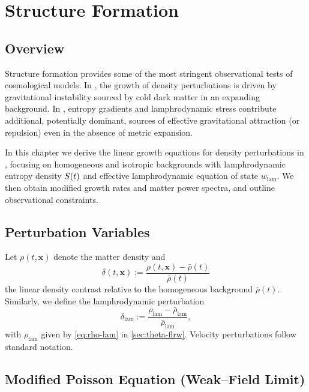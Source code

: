 
\chapter{Structure Formation}
\label{chap:structure-formation}

\section{Overview}

Structure formation provides some of the most stringent observational
tests of cosmological models. In \LCDM{}, the growth of density
perturbations is driven by gravitational instability sourced by cold
dark matter in an expanding background. In \rsvpabbr{}, entropy gradients
and lamphrodynamic stress contribute additional, potentially dominant,
sources of effective gravitational attraction (or repulsion) even in
the absence of metric expansion.

In this chapter we derive the linear growth equations for density
perturbations in \rsvpabbr{}, focusing on homogeneous and isotropic
backgrounds with lamphrodynamic entropy density $S(t)$ and
effective lamphrodynamic equation of state $w_{\mathrm{lam}}$. We then
obtain modified growth rates and matter power spectra, and outline
observational constraints.

\section{Perturbation Variables}

Let $\rho(t,\mathbf{x})$ denote the matter density and
\[
  \delta(t,\mathbf{x}) := \frac{\rho(t,\mathbf{x}) - \bar{\rho}(t)}
  {\bar{\rho}(t)}
\]
the linear density contrast relative to the homogeneous background
$\bar{\rho}(t)$. Similarly, we define the lamphrodynamic perturbation
\[
  \delta_{\mathrm{lam}}
  := \frac{\rho_{\mathrm{lam}} - \bar{\rho}_{\mathrm{lam}}}
  {\bar{\rho}_{\mathrm{lam}}},
\]
with $\rho_{\mathrm{lam}}$ given by \eqref{eq:rho-lam} in
\cref{sec:theta-flrw}. Velocity perturbations follow standard notation.

\section{Modified Poisson Equation (Weak--Field Limit)}


